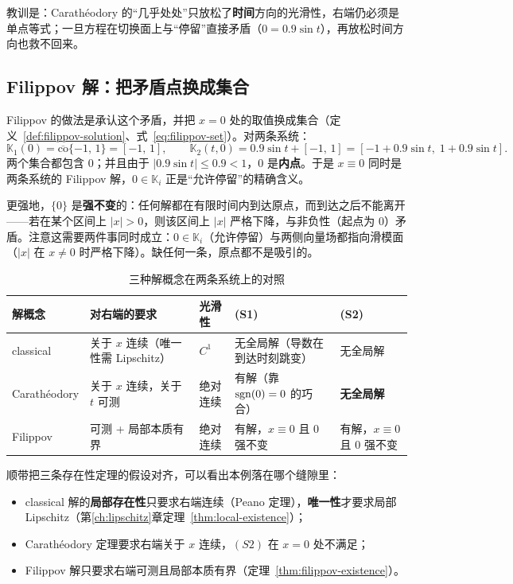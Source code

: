 教训是：Carathéodory 的“几乎处处”只放松了\textbf{时间}方向的光滑性，右端仍必须是单点等式；一旦方程在切换面上与“停留”直接矛盾（$0=0.9\sin t$），再放松时间方向也救不回来。

\subsection{Filippov 解：把矛盾点换成集合}

Filippov 的做法是承认这个矛盾，并把 $x=0$ 处的取值换成集合（定义~\ref{def:filippov-solution}、式~\eqref{eq:filippov-set}）。对两条系统：
\begin{equation}\label{eq:case-filippov}
  \mathbb{K}_1(0)=\overline{\mathrm{co}}\{-1,\,1\}=[-1,\,1],
  \qquad
  \mathbb{K}_2(t,0)=0.9\sin t+[-1,\,1]=[-1+0.9\sin t,\;1+0.9\sin t].
\end{equation}
两个集合都包含 $0$；并且由于 $|0.9\sin t|\le0.9<1$，$0$ 是\textbf{内点}。于是 $x\equiv0$ 同时是两条系统的 Filippov 解，$0\in\mathbb{K}_i$ 正是“允许停留”的精确含义。

更强地，$\{0\}$ 是\textbf{强不变}的：任何解都在有限时间内到达原点，而到达之后不能离开——若在某个区间上 $|x|>0$，则该区间上 $|x|$ 严格下降，与非负性（起点为 $0$）矛盾。注意这需要两件事同时成立：$0\in\mathbb{K}_i$（允许停留）与两侧向量场都指向滑模面（$|x|$ 在 $x\neq0$ 时严格下降）。缺任何一条，原点都不是吸引的。

\begin{table}[!htb]
  \centering
  \small
  \begin{tabular}{@{}p{2.2cm}|p{3.2cm}|p{2.2cm}|p{3.4cm}|p{2.8cm}@{}}
    \hline
    解概念 & 对右端的要求 & 光滑性 & (S1) & (S2) \\
    \hline
    classical & 关于 $x$ 连续（唯一性需 Lipschitz） & $C^1$ & 无全局解（导数在到达时刻跳变） & 无全局解 \\
    \hline
    Carathéodory & 关于 $x$ 连续，关于 $t$ 可测 & 绝对连续 & 有解（靠 $\operatorname{sgn}(0)=0$ 的巧合） & \textbf{无全局解} \\
    \hline
    Filippov & 可测 + 局部本质有界 & 绝对连续 & 有解，$x\equiv0$ 且 $0$ 强不变 & 有解，$x\equiv0$ 且 $0$ 强不变 \\
    \hline
  \end{tabular}
  \caption{三种解概念在两条系统上的对照}
  \label{tab:case-solution-concepts}
\end{table}

顺带把三条存在性定理的假设对齐，可以看出本例落在哪个缝隙里：

\begin{itemize}
  \item classical 解的\textbf{局部存在性}只要求右端连续（Peano 定理），\textbf{唯一性}才要求局部 Lipschitz（第\ref{ch:lipschitz}章定理~\ref{thm:local-existence}）；
  \item Carathéodory 定理要求右端关于 $x$ 连续，$(S2)$ 在 $x=0$ 处不满足；
  \item Filippov 解只要求右端可测且局部本质有界（定理~\ref{thm:filippov-existence}）。
\end{itemize}

